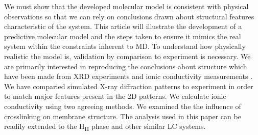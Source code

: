 We must show that the developed molecular model is consistent with
physical observations so that we can rely on conclusions drawn about %
structural features characteristic of the system. This article will
illustrate the development of a predictive molecular model and the steps
taken to ensure it mimics the real system within the constraints 
inherent to MD. To understand how physically realistic the model is,
validation by comparison to experiment is necessary. We are primarily
interested in reproducing the conclusions about structure which have been
made from XRD experiments and ionic conductivity measurements
\cite{feng_thin_2016}. We have comparied simulated X-ray diffraction
patterns to experiment in order to match major features present in the
2D patterns. We calculate ionic conductivity using two agreeing methods.
We examined the the influence of crosslinking on membrane structure. 
The analysis used in this paper can be readily extended to the 
H\textsubscript{II} phase and other similar LC systems.
